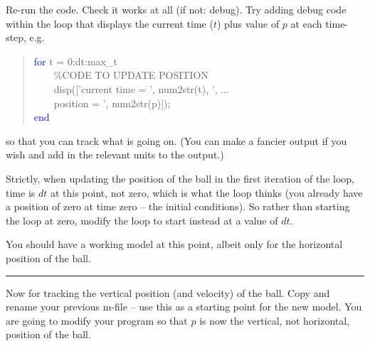 \documentclass{tufte-book} %
\newenvironment{docspecmargin}{\begin{quotation}\ttfamily\footnotesize\parskip0pt\parindent0pt\ignorespaces}{\end{quotation}}
\begin{document}
Re-run the code. Check it works at all (if not: debug). Try adding debug code within the loop that displays the current time (\(t\)) plus value of \(p\) at each time-step, e.g.
\begin{docspecmargin}
\textcolor{blue}{for} t = 0:dt:max\_t
\\ \ \ \ \ \textcolor[rgb]{0,0.501961,0}{\%CODE TO UPDATE POSITION}
\\ \ \ \ \ disp(['current time = ', num2str(t), ', ...
\\ \ \ \ \ position = ', num2str(p)]);
\\\textcolor{blue}{end}
\end{docspecmargin}
so that you can track what is going on. (You can make a fancier output if you wish and add in the relevant units to the output.)

Strictly, when updating the position of the ball in the first iteration of the loop, time is \(dt\) at this point, not zero, which is what the loop thinks (you already have a position of zero at time zero -- the initial conditions). So rather than starting the loop at zero,  modify the loop to start instead at a value of \(dt\).

You should have a working model at this point, albeit only for the horizontal position of the ball.

\vspace{1mm}
\noindent\rule{4cm}{0.5pt}
\vspace{-2mm}

 Now for tracking the vertical position (and velocity) of the ball. Copy and rename your previous \textsf{m-file} -- use this as a starting point for the new model. You are going to modify your program so that \(p\) is now the vertical, not horizontal, position of the ball.
\end{document}
